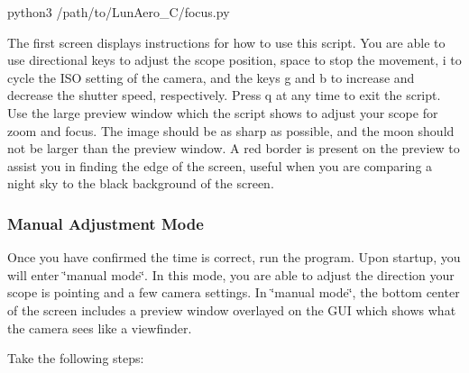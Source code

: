 \begin{DoxyCode}
python3 /path/to/LunAero\_C/focus.py
\end{DoxyCode}


The first screen displays instructions for how to use this script. You are able to use directional keys to adjust the scope position, {\ttfamily space} to stop the movement, {\ttfamily i} to cycle the I\+SO setting of the camera, and the keys {\ttfamily g} and {\ttfamily b} to increase and decrease the shutter speed, respectively. Press {\ttfamily q} at any time to exit the script. Use the large preview window which the script shows to adjust your scope for zoom and focus. The image should be as sharp as possible, and the moon should not be larger than the preview window. A red border is present on the preview to assist you in finding the edge of the screen, useful when you are comparing a night sky to the black background of the screen.

\subsubsection*{Manual Adjustment Mode}

Once you have confirmed the time is correct, run the program. Upon startup, you will enter \char`\"{}manual mode\char`\"{}. In this mode, you are able to adjust the direction your scope is pointing and a few camera settings. In \char`\"{}manual mode\char`\"{}, the bottom center of the screen includes a preview window overlayed on the G\+UI which shows what the camera sees like a viewfinder.

Take the following steps\+:


